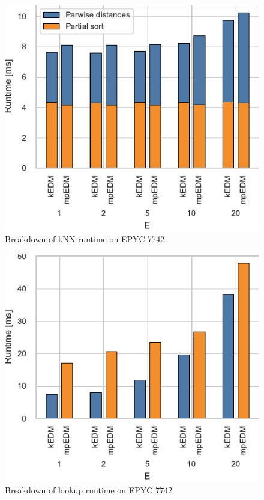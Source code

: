 \documentclass[conference]{IEEEtran}
\begin{document}
\begin{figure}
    \centering
    \includegraphics{figs/breakdown_epyc}
    \caption{Breakdown of kNN runtime on EPYC 7742}%
    \label{fig:architecture}
\end{figure}

\begin{figure}
    \centering
    \includegraphics{figs/runtime_lookup_epyc}
    \caption{Breakdown of lookup runtime on EPYC 7742}%
    \label{fig:architecture}
\end{figure}
\end{document}
